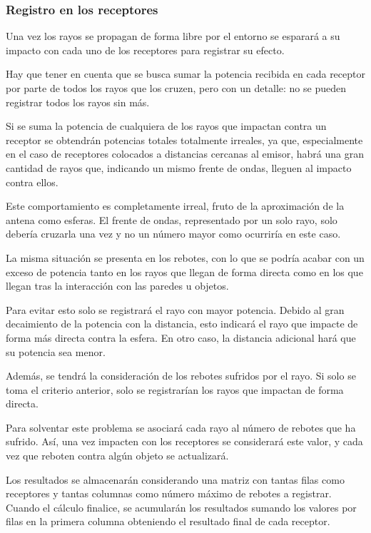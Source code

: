 \subsubsection*{Registro en los receptores}

Una vez los rayos se propagan de forma libre por el entorno se esparará a su impacto con cada uno de los receptores para registrar su efecto.

Hay que tener en cuenta que se busca sumar la potencia recibida en cada receptor por parte de todos los rayos que los cruzen, pero con un detalle: no se pueden registrar todos los rayos sin más.

Si se suma la potencia de cualquiera de los rayos que impactan contra un receptor se obtendrán potencias totales totalmente irreales, ya que, especialmente en el caso de receptores colocados a distancias cercanas al emisor, habrá una gran cantidad de rayos que, indicando un mismo frente de ondas, lleguen al impacto contra ellos.

Este comportamiento es completamente irreal, fruto de la aproximación de la antena como esferas.
El frente de ondas, representado por un solo rayo, solo debería cruzarla una vez y no un número mayor como ocurriría en este caso.

La misma situación se presenta en los rebotes, con lo que se podría acabar con un exceso de potencia tanto en los rayos que llegan de forma directa como en los que llegan tras la interacción con las paredes u objetos.

Para evitar esto solo se registrará el rayo con mayor potencia.
Debido al gran decaimiento de la potencia con la distancia, esto indicará el rayo que impacte de forma más directa contra la esfera.
En otro caso, la distancia adicional hará que su potencia sea menor.

Además, se tendrá la consideración de los rebotes sufridos por el rayo.
Si solo se toma el criterio anterior, solo se registrarían los rayos que impactan de forma directa.

Para solventar este problema se asociará cada rayo al número de rebotes que ha sufrido.
Así, una vez impacten con los receptores se considerará este valor, y cada vez que reboten contra algún objeto se actualizará.

Los resultados se almacenarán considerando una matriz con tantas filas como receptores y tantas columnas como número máximo de rebotes a registrar.
Cuando el cálculo finalice, se acumularán los resultados sumando los valores por filas en la primera columna obteniendo el resultado final de cada receptor.

